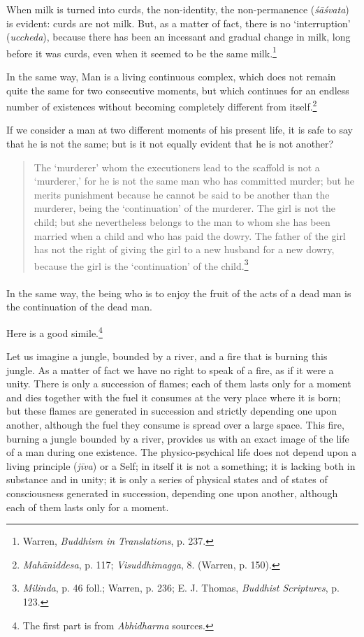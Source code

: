 \documentclass[a4paper, 11pt, oneside, english]{article}
\begin{document}
When milk is turned into curds, the non-identity, the non-permanence (\emph{śāśvata}) is evident: curds are not milk. But, as a matter of fact, there is no `interruption' (\emph{uccheda}), because there has been an incessant and gradual change in milk, long before it was curds, even when it seemed to be the same milk.\footnote{Warren, \emph{Buddhism in Translations}, p. 237.}

In the same way, Man is a living continuous complex, which does not remain quite the same for two consecutive moments, but which continues for an endless number of existences without becoming completely different from itself.\footnote{\emph{Mahāniddesa}, p. 117; \emph{Visuddhimagga}, 8. (Warren, p. 150).}

If we consider a man at two different moments of his present life, it is safe to say that he is not the same; but is it not equally evident that he is not another?
\begin{quotation}
\small
The `murderer' whom the executioners lead to the scaffold is not a `murderer,' for he is not the same man who has committed murder; but he merits punishment because he cannot be said to be another than the murderer, being the `continuation' of the murderer. The girl is not the child; but she nevertheless belongs to the man to whom she has been married when a child and who has paid the dowry. The father of the girl has not the right of giving the girl to a new husband for a new dowry, because the girl is the `continuation' of the child.\footnote{\emph{Milinda}, p. 46 foll.; Warren, p. 236; E. J. Thomas, \emph{Buddhist Scriptures}, p. 123.}
\end{quotation}
\paragraph{}
In the same way, the being who is to enjoy the fruit of the acts of a dead man is the continuation of the dead man.

Here is a good simile.\footnote{The first part is from \emph{Abhidharma} sources.}

Let us imagine a jungle, bounded by a river, and a fire that is burning this jungle. As a matter of fact we have no right to speak of a fire, as if it were a unity. There is only a succession of flames; each of them lasts only for a moment and dies together with the fuel it consumes at the very place where it is born; but these flames are generated in succession and strictly depending one upon another, although the fuel they consume is spread over a large space. This fire, burning a jungle bounded by a river, provides us with an exact image of the life of a man during one existence. The physico-psychical life does not depend upon a living principle (\emph{jīva}) or a Self; in itself it is not a something; it is lacking both in substance and in unity; it is only a series of physical states and of states of consciousness generated in succession, depending one upon another, although each of them lasts only for a moment.
\end{document}
